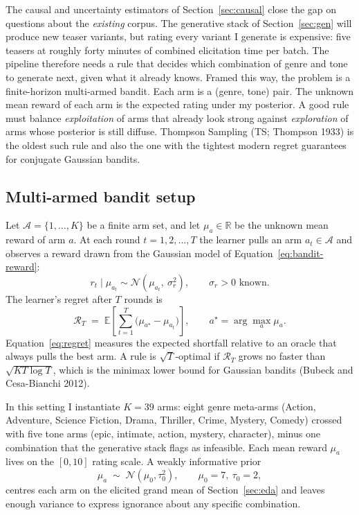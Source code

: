 \documentclass{article}
\begin{document}
The causal and uncertainty estimators of Section~\ref{sec:causal} close the gap on questions about the \emph{existing} corpus. The generative stack of Section~\ref{sec:gen} will produce new teaser variants, but rating every variant I generate is expensive: five teasers at roughly forty minutes of combined elicitation time per batch. The pipeline therefore needs a rule that decides which combination of genre and tone to generate next, given what it already knows. Framed this way, the problem is a finite-horizon multi-armed bandit. Each arm is a (genre, tone) pair. The unknown mean reward of each arm is the expected rating under my posterior. A good rule must balance \emph{exploitation} of arms that already look strong against \emph{exploration} of arms whose posterior is still diffuse. Thompson Sampling (TS; Thompson 1933) is the oldest such rule and also the one with the tightest modern regret guarantees for conjugate Gaussian bandits.

\subsection{Multi-armed bandit setup}

Let $\mathcal{A} = \{1, \ldots, K\}$ be a finite arm set, and let $\mu_a \in \mathbb{R}$ be the unknown mean reward of arm $a$. At each round $t = 1, 2, \ldots, T$ the learner pulls an arm $a_t \in \mathcal{A}$ and observes a reward drawn from the Gaussian model of Equation~\ref{eq:bandit-reward}:
\begin{equation}
r_t \mid \mu_{a_t} \sim \mathcal{N}(\mu_{a_t},\ \sigma_r^2), \qquad \sigma_r > 0 \text{ known.}
\label{eq:bandit-reward}
\end{equation}
The learner's regret after $T$ rounds is
\begin{equation}
\mathcal{R}_T \;=\; \mathbb{E}\!\left[\sum_{t=1}^T \bigl(\mu_{a^\star} - \mu_{a_t}\bigr)\right], \qquad a^\star = \arg\max_a \mu_a.
\label{eq:regret}
\end{equation}
Equation~\ref{eq:regret} measures the expected shortfall relative to an oracle that always pulls the best arm. A rule is $\sqrt{T}$-optimal if $\mathcal{R}_T$ grows no faster than $\sqrt{KT\log T}$, which is the minimax lower bound for Gaussian bandits (Bubeck and Cesa-Bianchi 2012).

In this setting I instantiate $K = 39$ arms: eight genre meta-arms (Action, Adventure, Science Fiction, Drama, Thriller, Crime, Mystery, Comedy) crossed with five tone arms (epic, intimate, action, mystery, character), minus one combination that the generative stack flags as infeasible. Each mean reward $\mu_a$ lives on the $[0, 10]$ rating scale. A weakly informative prior
\begin{equation}
\mu_a \;\sim\; \mathcal{N}(\mu_0, \tau_0^2), \qquad \mu_0 = 7,\ \tau_0 = 2,
\label{eq:ts-prior}
\end{equation}
centres each arm on the elicited grand mean of Section~\ref{sec:eda} and leaves enough variance to express ignorance about any specific combination.
\end{document}
